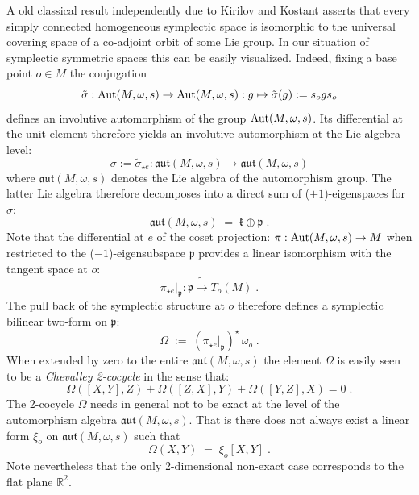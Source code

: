 \documentclass{article}
\newcommand{\R}{\mathbb R}
\newcommand{\kk}{\mathfrak k}
\newcommand{\pp}{\mathfrak p}
\def \R{{\mathbb R}}
\begin{document}
\noindent A old classical result independently due to Kirilov and Kostant \cite{Kos,Kir} asserts that every simply connected homogeneous symplectic
space is isomorphic to the universal covering space of a co-adjoint orbit of some Lie group. In our situation
of symplectic symmetric spaces this can be easily visualized. Indeed, fixing a base point $o\in M$ the conjugation
\begin{equation}
\tilde{\sigma}:\mbox{\rm Aut}(M,\omega,s)\to\mbox{\rm Aut}(M,\omega,s):g\mapsto\tilde{\sigma}(g):=s_ogs_o
\end{equation}
defines an involutive automorphism of the group $\mbox{\rm Aut}(M,\omega,s)$. Its differential at the unit
element therefore yields an involutive automorphism at the Lie algebra level:
\begin{equation}
\sigma:=\tilde{\sigma}_{\star e}:\mathfrak{aut}(M,\omega,s)\to\mathfrak{aut}(M,\omega,s)
\end{equation}
where $\mathfrak{aut}(M,\omega,s)$ denotes the Lie algebra of the automorphism group.
The latter Lie algebra therefore decomposes into a direct sum of ($\pm 1$)-eigenspaces for $\sigma$:
\begin{equation}
\mathfrak{aut}(M,\omega,s)\;=\;\kk\oplus\pp\;.
\end{equation}
Note that the differential at $e$ of the coset projection: $\pi:\mbox{\rm Aut}(M,\omega,s)\to M$
when restricted to the ($-1$)-eigensubspace $\pp$ provides a linear isomorphism with the tangent space at $o$:
\begin{equation}
\pi_{\star e}|_\pp:\pp\tilde{\longrightarrow}T_o(M)\;.
\end{equation}
The pull back of the symplectic structure at $o$ therefore defines a symplectic bilinear two-form on $\pp$:
\begin{equation}
\Omega\;:=\;(\pi_{\star e}|_\pp)^\star\,\omega_o\;.
\end{equation}
When extended by zero to the entire $\mathfrak{aut}(M,\omega,s)$ the element $\Omega$ is easily seen
to be a {\sl Chevalley 2-cocycle} in the sense that:
\begin{equation}
\Omega([X,Y],Z)+\Omega([Z,X],Y)+\Omega([Y,Z],X)=0\;.
\end{equation}
The 2-cocycle $\Omega$ needs in general not to be exact at the level of the automorphism algebra $\mathfrak{aut}(M,\omega,s)$. That is there does not always exist a linear form $\xi_o$
on $\mathfrak{aut}(M,\omega,s)$ such that 
\begin{equation}\label{XI}
\Omega(X,Y)\;=\;\xi_o[X,Y]\;.
\end{equation}
Note nevertheless that the only 2-dimensional non-exact case corresponds
to the flat plane $\R^2$. 
\end{document}
